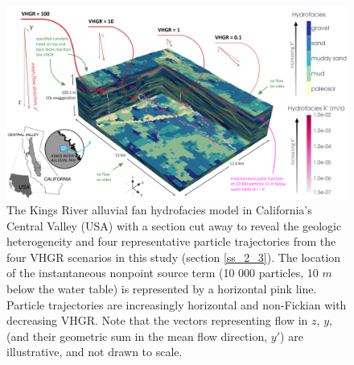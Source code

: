 \begin{figure}[H]
	\centering
	\includegraphics[width=\textwidth]{ch4_figs/krf_part_traj_00_03-01.png}
	\caption{The Kings River alluvial fan hydrofacies model in California's Central Valley (USA) with a section cut away to reveal the geologic heterogeneity and four representative particle trajectories from the four VHGR scenarios in this study (section \ref{ss_2_3}). The location of the instantaneous nonpoint source term (10 000 particles, 10 $m$ below the water table) is represented by a horizontal pink line. Particle trajectories are increasingly horizontal and non-Fickian with decreasing VHGR. Note that the vectors representing flow in $z$, $y$, (and their geometric sum in the mean flow direction, $y'$) are illustrative, and not drawn to scale.}
	\label{fig:model}
\end{figure}


